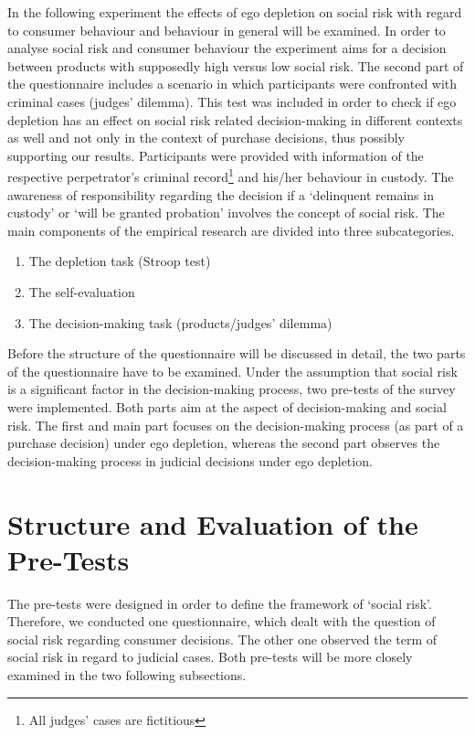 \onehalfspacing
In the following experiment the effects of ego depletion on social risk with regard to consumer behaviour and behaviour in general will be examined. In order to analyse social risk and consumer behaviour the experiment aims for a decision between products with supposedly high versus low social risk. The second part of the questionnaire includes a scenario in which participants were confronted with criminal cases (judges’ dilemma). This test was included in order to check if ego depletion has an effect on social risk related decision-making in different contexts as well and not only in the context of purchase decisions, thus possibly supporting our results. Participants were provided with information of the respective perpetrator’s criminal record\footnote{All judges’ cases are fictitious} and his/her behaviour in custody. The awareness of responsibility regarding the decision if a ‘delinquent remains in custody’ or ‘will be granted probation’ involves the concept of social risk.
The main components of the empirical research are divided into three subcategories. 
\begin{enumerate}
\item The depletion task (Stroop test)
\item The self-evaluation 
\item The decision-making task (products/judges’ dilemma)
\end{enumerate}
Before the structure of the questionnaire will be discussed in detail, the two parts of the questionnaire have to be examined. Under the assumption that social risk is a significant factor in the decision-making process, two pre-tests of the survey were implemented. Both parts aim at the aspect of decision-making and social risk. The first and main part focuses on the decision-making process (as part of a purchase decision) under ego depletion, whereas the second part observes the decision-making process in judicial decisions under ego depletion. 
\section{Structure and Evaluation of the Pre-Tests}
The pre-tests were designed in order to define the framework of ‘social risk’. Therefore, we conducted one questionnaire, which dealt with the question of social risk regarding consumer decisions. The other one observed the term of social risk in regard to judicial cases. Both pre-tests will be more closely examined in the two following subsections.

